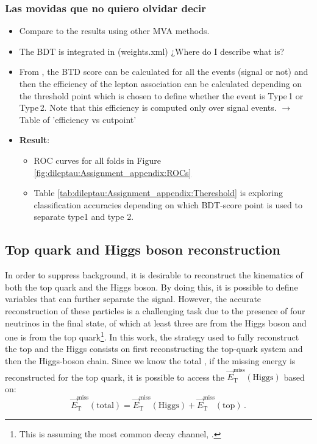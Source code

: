\subsubsection{Las movidas que no quiero olvidar decir}
\begin{itemize}
	\item Compare to the results using other MVA methods.
	\item The BDT is integrated in \thqloop (weights.xml) ¿Where do I describe what \thqloop is?
	\item From \thqloop, the BTD score can be calculated for all the events (signal or not) and then 
	the efficiency of the lepton association can be calculated depending on the threshold point which is
	chosen to define whether the event is Type$\,$1 or Type$\,$2. Note that this efficiency is computed only over
	signal events. $\rightarrow$ Table of 'efficiency vs cutpoint'
	
	\item \textbf{Result}: 
		\begin{itemize}
			\item ROC curves for all folds in Figure \ref{fig:dileptau:Assignment_appendix:ROCs}
			\item Table \ref{tab:dileptau:Assignment_appendix:Thereshold} is exploring classification 
			accuracies depending on which BDT-score point is used to separate type1 and type 2.	
		\end{itemize}
\end{itemize}



\subsection{Top quark and Higgs boson reconstruction}
\label{sec:ChaptH:Sig:EventReconstruction} 
In order to suppress background, it is desirable to reconstruct the 
kinematics of both the top quark and the Higgs boson. 
By doing this, it is possible to define variables that can further separate the signal.
However, the accurate reconstruction of these particles is a challenging task 
due to the presence of four neutrinos in the final state, of which at least three 
are from the Higgs boson and one is from the top quark\footnote{This is 
assuming the most common decay channel, \Htautau.}. 
In this work, the strategy used to fully reconstruct the top and the Higgs consists on first
reconstructing the top-quark system and then the Higgs-boson chain. Since we know
the total \MET, if the missing energy is reconstructed for the top quark, 
it is possible to access the $\overrightarrow{E}_{\text{T}}^{\text{miss}} (\text{Higgs})$ based on:
\begin{equation*}
	\overrightarrow{E}_{\text{T}}^{\text{miss}} (\text{total}) = \overrightarrow{E}_{\text{T}}^{\text{miss}} (\text{Higgs}) + \overrightarrow{E}_{\text{T}}^{\text{miss}} (\text{top}) \,.
\end{equation*}

